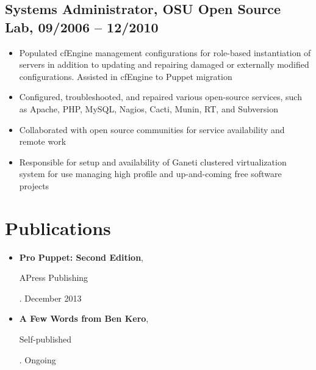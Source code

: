 \documentclass[a4paper,12pt]{report}
\begin{document}
\subsection*{Systems Administrator, OSU Open Source Lab, 09/2006 -- 12/2010}
\begin{itemize} \itemsep -0.25em
\item Populated cfEngine management configurations for role-based instantiation of servers in addition to updating and repairing damaged or externally modified configurations. Assisted in cfEngine to Puppet migration
\item Configured, troubleshooted, and repaired various open-source services, such as Apache, PHP, MySQL, Nagios, Cacti, Munin, RT, and Subversion
\item Collaborated with open source communities for service availability and remote work
\item Responsible for setup and availability of Ganeti clustered virtualization system for use managing high profile and up-and-coming free software projects
\end{itemize}

\section*{Publications}
\begin{itemize} \itemsep -0.25em
\item \textbf{Pro Puppet: Second Edition}, \begin{it}APress Publishing\end{it}. December 2013
\item \textbf{A Few Words from Ben Kero}, \begin{it}Self-published\end{it}. Ongoing
\end{itemize}
\end{document}
